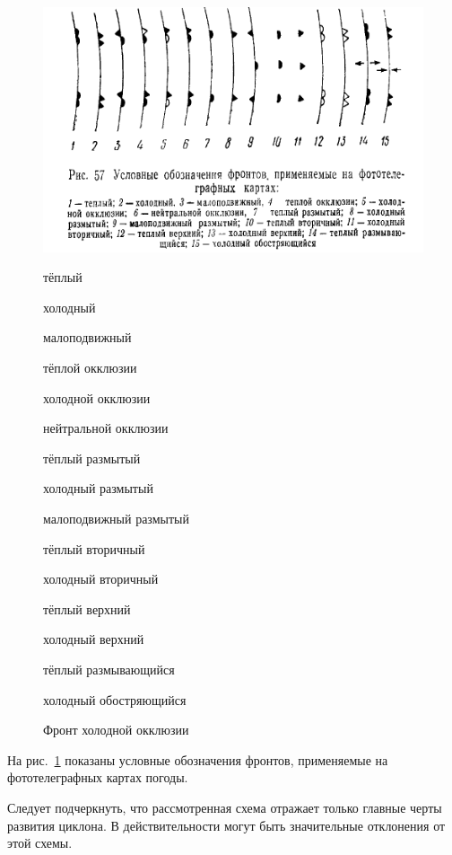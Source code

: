 \documentclass[a4paper, 12pt, twoside, draft, book, russian, fittopage, cyremdash, openright]{ncc}
\begin{document}
\begin{figure}[htb]
   \centering
   \includegraphics[scale=1]{11_fronts_marks.pdf}
   \caption{Фронт холодной окклюзии}
   \label{fig:fronts_marks}
   \small
   \begin{enumerate*}[itemjoin={{; }}, label={\arabic*~\--}]
   \item тёплый
   \item холодный
   \item малоподвижный
   \item тёплой окклюзии
   \item холодной окклюзии %
   \item нейтральной окклюзии
   \item тёплый размытый
   \item холодный размытый
   \item малоподвижный размытый
   \item тёплый вторичный %
   \item холодный вторичный
   \item тёплый верхний
   \item холодный верхний
   \item тёплый размывающийся
   \item холодный обостряющийся %
   \end{enumerate*}
\end{figure}

На рис.~\ref{fig:fronts_marks} показаны условные обозначения фронтов,
применяемые на фототелеграфных картах погоды.

Следует подчеркнуть, что рассмотренная схема отражает только главные
черты развития циклона. В действительности могут быть значительные
отклонения от этой схемы.
\end{document}
